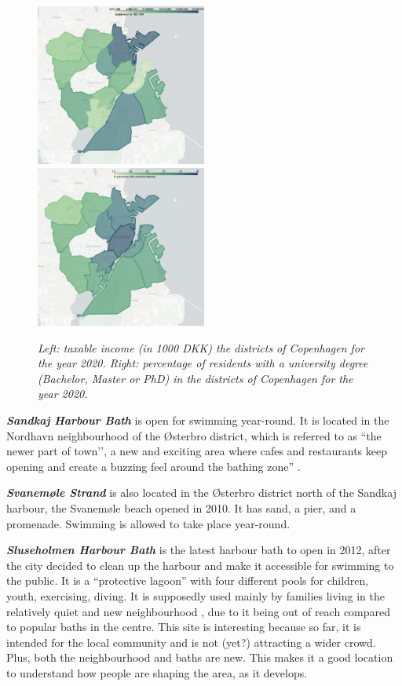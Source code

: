 \documentclass{article}
\newcommand{\bisection}[1]{\textbf{\textit{#1}}}
\begin{document}
\begin{figure}[htp]
	\includegraphics[width=0.5\textwidth]{copenhagen_income_taxable.png}
	\includegraphics[width=0.5\textwidth]{copenhagen_edu.png}
	\caption{\textit{Left: taxable income (in 1000 DKK) the districts of Copenhagen for the year 2020. Right: percentage of residents with a university degree (Bachelor, Master or PhD) in the districts of Copenhagen for the year 2020.}}
	  \label{fig:map_income}
\end{figure}

\bisection{Sandkaj Harbour Bath} is open for swimming year-round. It is located in the Nordhavn neighbourhood of the Østerbro district, which is referred to as ``the newer part of town’’, a new and exciting area where cafes and restaurants keep opening and create a buzzing feel around the bathing zone” \parencite{visitcopenhagen_baths}.

\bisection{Svanemøle Strand} is also located in the Østerbro district north of the Sandkaj harbour, the Svanemøle beach opened in 2010. It has sand, a pier, and a promenade. Swimming is allowed to take place year-round.

\bisection{Sluseholmen Harbour Bath} is the latest harbour bath to open in 2012, after the city decided to clean up the harbour and make it accessible for swimming to the public. It is a “protective lagoon” \parencite{visitcopenhagen_baths} with four different pools for children, youth, exercising, diving. It is supposedly used mainly by families living in the relatively quiet and new neighbourhood \parencite{bak_2015}, due to it being out of reach compared to popular baths in the centre. This site is interesting because so far, it is intended for the local community and is not (yet?) attracting a wider crowd. Plus, both the neighbourhood and baths are new. This makes it a good location to understand how people are shaping the area, as it develops.
\end{document}
